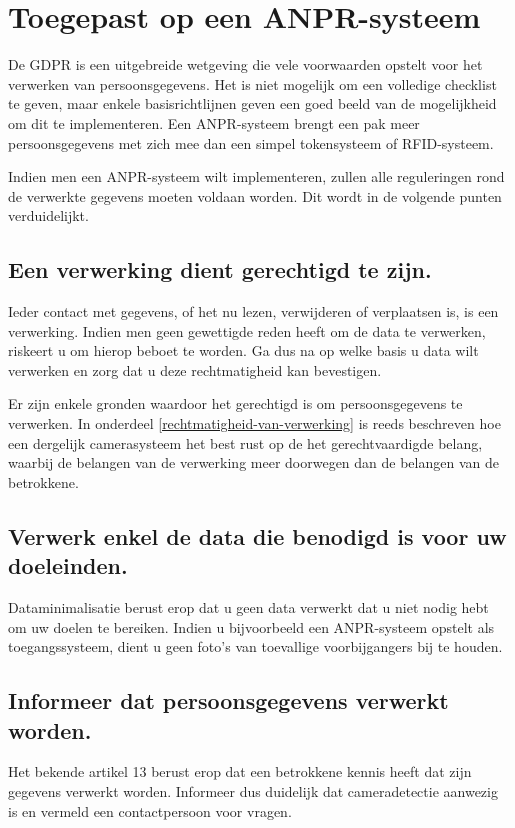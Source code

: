 \section{Toegepast op een ANPR-systeem}
De GDPR is een uitgebreide wetgeving die vele voorwaarden opstelt voor het verwerken van persoonsgegevens. Het is niet mogelijk om een volledige checklist te geven, maar enkele basisrichtlijnen geven een goed beeld van de mogelijkheid om dit te implementeren. Een ANPR-systeem brengt een pak meer persoonsgegevens met zich mee dan een simpel tokensysteem of RFID-systeem.

Indien men een ANPR-systeem wilt implementeren, zullen alle reguleringen rond de verwerkte gegevens moeten voldaan worden. Dit wordt in de volgende punten verduidelijkt.

\subsection{Een verwerking dient gerechtigd te zijn.}
Ieder contact met gegevens, of het nu lezen, verwijderen of verplaatsen is, is een verwerking. Indien men geen gewettigde reden heeft om de data te verwerken, riskeert u om hierop beboet te worden. Ga dus na op welke basis u data wilt verwerken en zorg dat u deze rechtmatigheid kan bevestigen.

Er zijn enkele gronden waardoor het gerechtigd is om persoonsgegevens te verwerken. In onderdeel \ref{rechtmatigheid-van-verwerking} is reeds beschreven hoe een dergelijk camerasysteem het best rust op de het gerechtvaardigde belang, waarbij de belangen van de verwerking meer doorwegen dan de belangen van de betrokkene. 

\subsection{Verwerk enkel de data die benodigd is voor uw doeleinden.}
Dataminimalisatie berust erop dat u geen data verwerkt dat u niet nodig hebt om uw doelen te bereiken. Indien u bijvoorbeeld een ANPR-systeem opstelt als toegangssysteem, dient u geen foto's van toevallige voorbijgangers bij te houden.

\subsection{Informeer dat persoonsgegevens verwerkt worden.}
Het bekende artikel 13 berust erop dat een betrokkene kennis heeft dat zijn gegevens verwerkt worden. Informeer dus duidelijk dat cameradetectie aanwezig is en vermeld een contactpersoon voor vragen.

